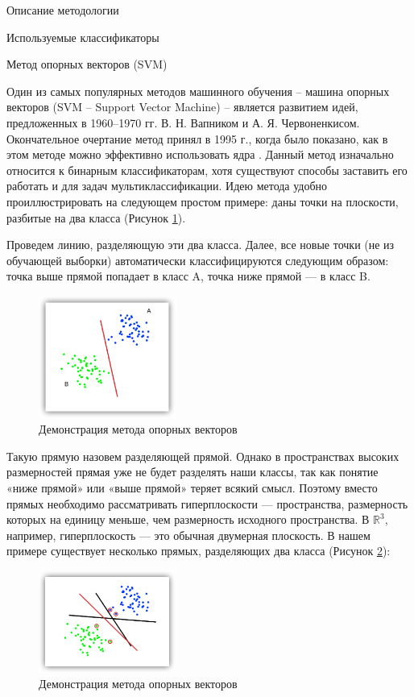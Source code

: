 \begin{section}{Описание методологии}
\begin{subsection}{Используемые классификаторы}
    \begin{subsubsection}{Метод опорных векторов (SVM)}

      Один из самых популярных методов машинного обучения – машина опорных векторов (SVM – Support Vector Machine) – является развитием идей, предложенных в 1960–1970 гг. В. Н. Вапником и А. Я. Червоненкисом. Окончательное очертание метод принял в 1995 г., когда было показано, как в этом методе можно эффективно использовать ядра \cite{Cortes}.
Данный метод изначально относится к бинарным классификаторам, хотя существуют способы заставить его работать и для задач мультиклассификации.
Идею метода удобно проиллюстрировать на следующем простом примере: даны точки на плоскости, разбитые на два класса (Рисунок \ref{pic:SVM1}).

  Проведем линию, разделяющую эти два класса. Далее, все новые точки (не из обучающей выборки) автоматически классифицируются следующим образом:
точка выше прямой попадает в класс A,
точка ниже прямой — в класс B.

\begin{figure}[ht!]
\centering
\includegraphics[width=0.4\textwidth]{pics/SVM1}
\caption{Демонстрация метода опорных векторов}
\label{pic:SVM1}
\end{figure}

Такую прямую назовем разделяющей прямой. Однако в пространствах высоких размерностей прямая уже не будет разделять наши классы, так как понятие «ниже прямой» или «выше прямой» теряет всякий смысл. Поэтому вместо прямых необходимо рассматривать гиперплоскости — пространства, размерность которых на единицу меньше, чем размерность исходного пространства. В $\mathbb{R}^3$, например, гиперплоскость — это обычная двумерная плоскость.
В нашем примере существует несколько прямых, разделяющих два класса (Рисунок \ref{pic:SVM2}):

\begin{figure}[ht!]
\centering
\includegraphics[width=0.4\textwidth]{pics/SVM2}
\caption{Демонстрация метода опорных векторов}
\label{pic:SVM2}
\end{figure}


\end{subsubsection}
\end{subsection}
\end{section}
